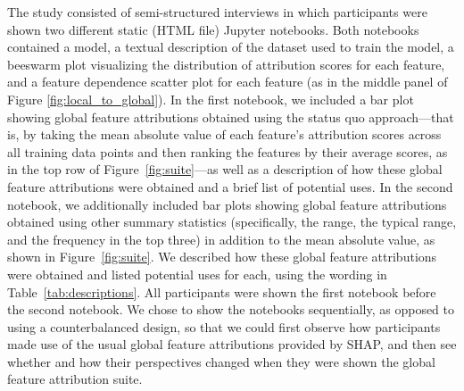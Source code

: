 \documentclass[11pt,dvipdfmx]{article}
\begin{document}
The study consisted of semi-structured interviews in which
participants were shown two different static (HTML file) Jupyter
notebooks.  Both notebooks contained a model, a textual description of
the dataset used to train the model, a beeswarm plot visualizing the
distribution of attribution scores for each feature, and a feature
dependence scatter plot for each feature (as in the middle panel of
Figure \ref{fig:local_to_global}). In the first notebook, we included
a bar plot showing global feature attributions obtained using the
status quo approach---that is, by taking the mean absolute value of
each feature's attribution scores across all training data points and
then ranking the features by their average scores, as in the top row
of Figure~\ref{fig:suite}---as well as a description of how these
global feature attributions were obtained and a brief list of
potential uses. In the second notebook, we additionally included bar
plots showing global feature attributions obtained using other summary
statistics (specifically, the range, the typical range, and the
frequency in the top three) in addition to the mean absolute value, as
shown in Figure~\ref{fig:suite}. We described how these global feature
attributions were obtained and listed potential uses for each, using
the wording in Table~\ref{tab:descriptions}. All participants were
shown the first notebook before the second notebook. We chose to show
the notebooks sequentially, as opposed to using a counterbalanced
design, so that we could first observe how participants made use of
the usual global feature attributions provided by SHAP, and then see
whether and how their perspectives changed when they were shown the
global feature attribution suite.
\end{document}
